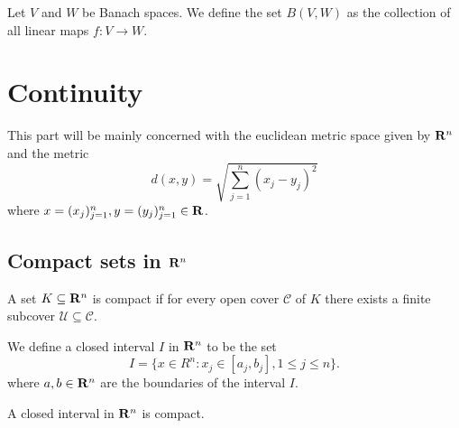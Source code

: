\begin{definition}
\label{def:banach-space-hom-set}
Let \(V\) and \(W\) be Banach spaces. We define the set \(B(V, W)\) as the
collection of all linear maps \(f: V \to W\).
\end{definition}

\section{Continuity}

\begin{remark}
  This part will be mainly concerned with the euclidean metric space given by
  \(\mathbf{R}^n\) and the metric
  \[
    d(x, y) = \sqrt{\sum_{j=1}^n (x_j - y_j)^2}
  \]
  where \(x = (x_j)_{j=1}^n, y = (y_j)_{j=1}^n \in \mathbf{R}\).
\end{remark}

\subsection{Compact sets in \texorpdfstring{\(\mathbf{R}^n\)}{Rn}}

\begin{definition}
  A set \(K \subseteq \mathbf{R}^n\) is compact if for every open cover \(\mathcal C\)
  of \(K\) there exists a finite subcover \(\mathcal U \subseteq \mathcal C\).
\end{definition}

\begin{definition}
  We define a closed interval \(I\) in \(\mathbf{R}^n\) to be the set
  \[
    I = \{x \in R^n : x_j \in [a_j, b_j], 1 \leq j \leq n\}.
  \]
  where \(a, b \in \mathbf{R}^n\) are the boundaries of the interval \(I\).
\end{definition}

\begin{proposition}\label{prop: closed-interval compact}
  A closed interval in \(\mathbf{R}^n\) is compact.
\end{proposition}

